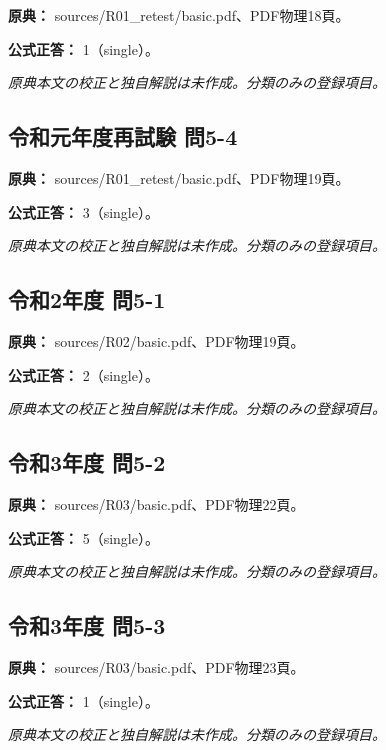 \noindent\textbf{原典：} sources/R01\_retest/basic.pdf、PDF物理18頁。

\textbf{公式正答：} 1（single）。

\par\textit{原典本文の校正と独自解説は未作成。分類のみの登録項目。}

\subsection{令和元年度再試験 問5-4}
\label{q:r01-ret-basic-5-4}

\noindent\textbf{原典：} sources/R01\_retest/basic.pdf、PDF物理19頁。

\textbf{公式正答：} 3（single）。

\par\textit{原典本文の校正と独自解説は未作成。分類のみの登録項目。}

\subsection{令和2年度 問5-1}
\label{q:r02-reg-basic-5-1}

\noindent\textbf{原典：} sources/R02/basic.pdf、PDF物理19頁。

\textbf{公式正答：} 2（single）。

\par\textit{原典本文の校正と独自解説は未作成。分類のみの登録項目。}

\subsection{令和3年度 問5-2}
\label{q:r03-reg-basic-5-2}

\noindent\textbf{原典：} sources/R03/basic.pdf、PDF物理22頁。

\textbf{公式正答：} 5（single）。

\par\textit{原典本文の校正と独自解説は未作成。分類のみの登録項目。}

\subsection{令和3年度 問5-3}
\label{q:r03-reg-basic-5-3}

\noindent\textbf{原典：} sources/R03/basic.pdf、PDF物理23頁。

\textbf{公式正答：} 1（single）。

\par\textit{原典本文の校正と独自解説は未作成。分類のみの登録項目。}

